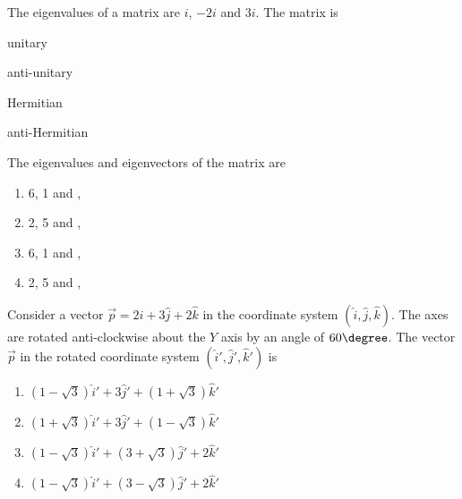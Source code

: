 \item The eigenvalues of a matrix are $i$, $-2i$ and $3i$. The matrix is
\hfill{}
\begin{enumerate}
\begin{multicols}{4}
\item unitary
\item anti-unitary
\item Hermitian
\item anti-Hermitian
\end{multicols}
\end{enumerate}
%
\item The eigenvalues and eigenvectors of the matrix  are 
\hfill{}
%
\begin{multicols}{2}
\begin{enumerate}
    \item 6, 1 and ,
    \item 2, 5 and ,
    \item 6, 1 and ,
    \item 2, 5 and ,
    \end{enumerate}
\end{multicols}
%
\item Consider a vector $\vec{p} = 2\hat{i} + 3\hat{j} + 2\hat{k}$ in the coordinate system $(\hat{i},\hat{j},\hat{k})$. The axes are rotated anti-clockwise about the $Y$ axis by an angle of $60\degree$. The vector $\vec{p}$ in the rotated coordinate system $(\hat{i}',\hat{j}',\hat{k}')$ is
\hfill{}
\begin{enumerate}
\item $(1-\sqrt{3})\hat{i}' + 3\hat{j}' + (1+\sqrt{3})\hat{k}'$
\item $(1+\sqrt{3})\hat{i}' + 3\hat{j}' + (1-\sqrt{3})\hat{k}'$
\item $(1-\sqrt{3})\hat{i}' + (3+\sqrt{3})\hat{j}' + 2\hat{k}'$
\item $(1-\sqrt{3})\hat{i}' + (3-\sqrt{3})\hat{j}' + 2\hat{k}'$
\end{enumerate}
